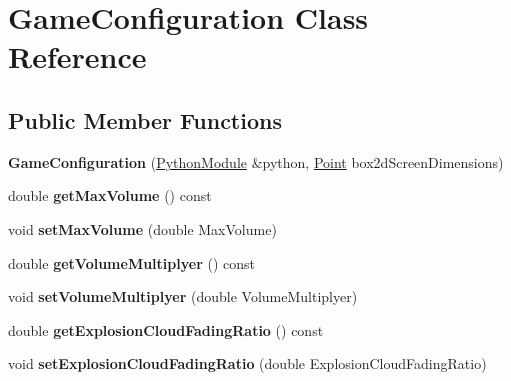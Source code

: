 \hypertarget{classGameConfiguration}{}\section{Game\+Configuration Class Reference}
\label{classGameConfiguration}
\subsection*{Public Member Functions}
\begin{DoxyCompactItemize}
\item 
{\bfseries Game\+Configuration} (\hyperlink{classPythonModule}{Python\+Module} \&python, \hyperlink{classPoint}{Point} box2d\+Screen\+Dimensions)\hypertarget{classGameConfiguration_a613c9040b73701dc7667820c1b153c3d}{}\label{classGameConfiguration_a613c9040b73701dc7667820c1b153c3d}

\item 
double {\bfseries get\+Max\+Volume} () const \hypertarget{classGameConfiguration_ae37a04f5d833831c1049f279a520220e}{}\label{classGameConfiguration_ae37a04f5d833831c1049f279a520220e}

\item 
void {\bfseries set\+Max\+Volume} (double Max\+Volume)\hypertarget{classGameConfiguration_ab57dae6e0a14e5d259efe074c8e78039}{}\label{classGameConfiguration_ab57dae6e0a14e5d259efe074c8e78039}

\item 
double {\bfseries get\+Volume\+Multiplyer} () const \hypertarget{classGameConfiguration_a6345cbff4a72681c704eb5aa990eb87c}{}\label{classGameConfiguration_a6345cbff4a72681c704eb5aa990eb87c}

\item 
void {\bfseries set\+Volume\+Multiplyer} (double Volume\+Multiplyer)\hypertarget{classGameConfiguration_a791c6583df2565c88be1773092b44e1a}{}\label{classGameConfiguration_a791c6583df2565c88be1773092b44e1a}

\item 
double {\bfseries get\+Explosion\+Cloud\+Fading\+Ratio} () const \hypertarget{classGameConfiguration_acddd17af78a0f245c07c2719aeab580e}{}\label{classGameConfiguration_acddd17af78a0f245c07c2719aeab580e}

\item 
void {\bfseries set\+Explosion\+Cloud\+Fading\+Ratio} (double Explosion\+Cloud\+Fading\+Ratio)\hypertarget{classGameConfiguration_a3438f0da225499cf2ca3583fdcbd0fec}{}\label{classGameConfiguration_a3438f0da225499cf2ca3583fdcbd0fec}


\end{DoxyCompactItemize}
